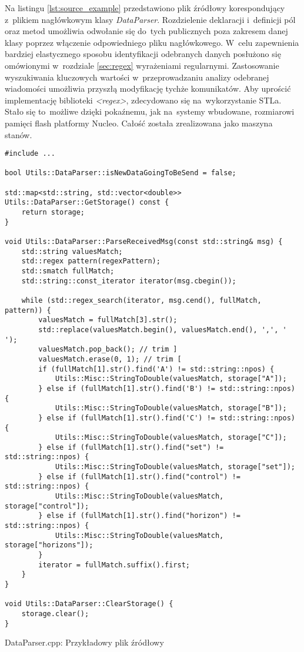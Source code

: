 Na listingu \ref{lst:source_example} przedstawiono plik źródłowy korespondujący z~plikiem
nagłówkowym klasy \textit{DataParser}. Rozdzielenie deklaracji i~definicji pól oraz metod umożliwia
odwołanie się do~tych publicznych poza zakresem danej klasy poprzez włączenie odpowiedniego 
pliku nagłówkowego. W~celu zapewnienia bardziej elastycznego sposobu identyfikacji odebranych
danych posłużono się omówionymi w~rozdziale \ref{sec:regex} wyrażeniami regularnymi. Zastosowanie
wyszukiwania kluczowych wartości w~przeprowadzaniu analizy odebranej wiadomości umożliwia
przyszłą modyfikację tychże komunikatów. Aby uprościć implementację biblioteki \textit{<regex>},
zdecydowano się na~wykorzystanie STLa. Stało się to~możliwe dzięki pokaźnemu, jak na~systemy
wbudowane, rozmiarowi pamięci flash platformy Nucleo. Całość została zrealizowana jako maszyna stanów.
\cite{cpp_bjarne}

\begin{listing}[p]
\centering
\begin{verbatim}
#include ...

bool Utils::DataParser::isNewDataGoingToBeSend = false;

std::map<std::string, std::vector<double>> Utils::DataParser::GetStorage() const {
    return storage;
}

void Utils::DataParser::ParseReceivedMsg(const std::string& msg) {
    std::string valuesMatch;
    std::regex pattern(regexPattern);
    std::smatch fullMatch;
    std::string::const_iterator iterator(msg.cbegin());

    while (std::regex_search(iterator, msg.cend(), fullMatch, pattern)) {
        valuesMatch = fullMatch[3].str();
        std::replace(valuesMatch.begin(), valuesMatch.end(), ',', ' ');
        valuesMatch.pop_back(); // trim ]
        valuesMatch.erase(0, 1); // trim [
        if (fullMatch[1].str().find('A') != std::string::npos) {
            Utils::Misc::StringToDouble(valuesMatch, storage["A"]);
        } else if (fullMatch[1].str().find('B') != std::string::npos) {
            Utils::Misc::StringToDouble(valuesMatch, storage["B"]);
        } else if (fullMatch[1].str().find('C') != std::string::npos) {
            Utils::Misc::StringToDouble(valuesMatch, storage["C"]);
        } else if (fullMatch[1].str().find("set") != std::string::npos) {
            Utils::Misc::StringToDouble(valuesMatch, storage["set"]);
        } else if (fullMatch[1].str().find("control") != std::string::npos) {
            Utils::Misc::StringToDouble(valuesMatch, storage["control"]);
        } else if (fullMatch[1].str().find("horizon") != std::string::npos) {
            Utils::Misc::StringToDouble(valuesMatch, storage["horizons"]);
        }
        iterator = fullMatch.suffix().first;
    }
}

void Utils::DataParser::ClearStorage() {
    storage.clear();
}
\end{verbatim}
\caption{DataParser.cpp: Przykładowy plik źródłowy}
\label{lst:source_example}
\end{listing}

